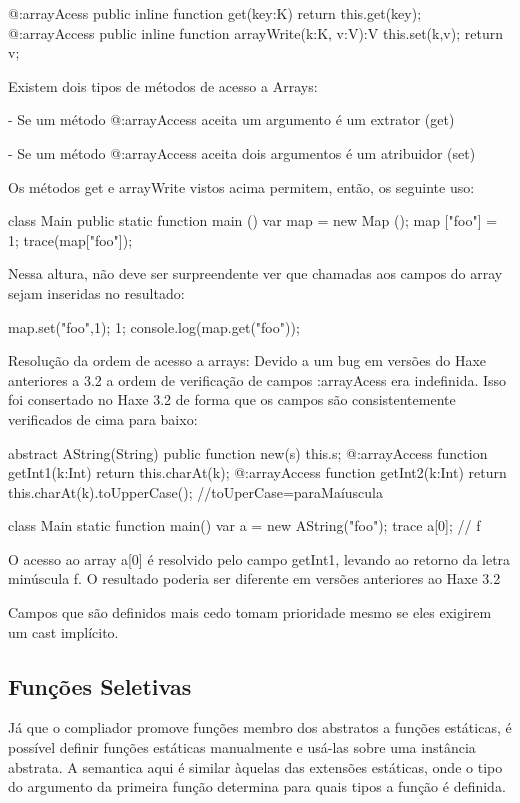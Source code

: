 {{{{@:arrayAcess public inline function
get(key:K) return this.get(key);
@:arrayAccess public inline function
arrayWrite(k:K, v:V):V {
    this.set(k,v);
    return v;
}

Existem dois tipos de métodos de acesso a Arrays:

  - Se um método @:arrayAccess aceita um argumento é um extrator (get)

  - Se um método @:arrayAccess aceita dois argumentos é um atribuidor (set)

Os métodos get e arrayWrite vistos acima permitem, então, os seguinte uso:

class Main {
    public static function main () {
       var map = new Map ();
       map ["foo"] = 1;
       trace(map["foo"]);
    }
}

Nessa altura, não deve ser surpreendente ver que chamadas aos campos do array sejam inseridas no resultado:

map.set("foo",1);
1;
console.log(map.get("foo"));

Resolução da ordem de acesso a arrays: Devido a um bug em versões do Haxe anteriores a 3.2 a ordem de verificação de campos :arrayAcess era indefinida. Isso foi consertado no Haxe 3.2 de forma que os campos são consistentemente verificados de cima para baixo:

abstract AString(String) {
    public function new(s) this.s;
    @:arrayAccess function getInt1(k:Int) {
        return this.charAt(k);
    }
    @:arrayAccess function getInt2(k:Int) {
        return this.charAt(k).toUpperCase(); //toUperCase=paraMaíuscula
    }
}

class Main {
    static function main() {
        var a = new AString("foo");
        trace a[0]; // f
    }
}

O acesso ao array a[0] é resolvido pelo campo getInt1, levando ao retorno da letra minúscula f. O resultado poderia ser diferente em versões anteriores ao Haxe 3.2

Campos que são definidos mais cedo tomam prioridade mesmo se eles exigirem um cast implícito.

\subsection{Funções Seletivas}

Já que o compliador promove funções membro dos abstratos a funções estáticas, é possível definir funções estáticas manualmente e usá-las sobre uma instância abstrata. A semantica aqui é similar àquelas das extensões estáticas, onde o tipo do argumento da primeira função determina para quais tipos a função é definida.

}}}}

